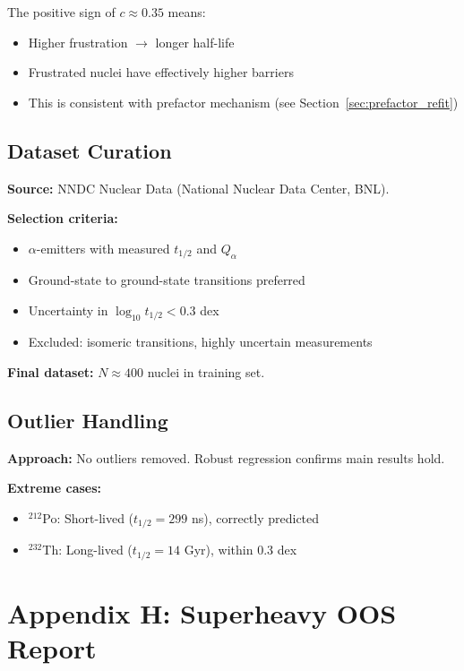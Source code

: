 \documentclass[11pt,a4paper]{article}
\begin{document}
The positive sign of $c \approx 0.35$ means:
\begin{itemize}[nosep]
    \item Higher frustration $\to$ longer half-life
    \item Frustrated nuclei have effectively higher barriers
    \item This is consistent with prefactor mechanism (see Section~\ref{sec:prefactor_refit})
\end{itemize}

\subsection{Dataset Curation}

\textbf{Source:} NNDC Nuclear Data (National Nuclear Data Center, BNL).

\textbf{Selection criteria:}
\begin{itemize}[nosep]
    \item $\alpha$-emitters with measured $t_{1/2}$ and $Q_\alpha$
    \item Ground-state to ground-state transitions preferred
    \item Uncertainty in $\log_{10} t_{1/2} < 0.3$ dex
    \item Excluded: isomeric transitions, highly uncertain measurements
\end{itemize}

\textbf{Final dataset:} $N \approx 400$ nuclei in training set.

\subsection{Outlier Handling}

\textbf{Approach:} No outliers removed. Robust regression confirms main results hold.

\textbf{Extreme cases:}
\begin{itemize}[nosep]
    \item $^{212}$Po: Short-lived ($t_{1/2} = 299$ ns), correctly predicted
    \item $^{232}$Th: Long-lived ($t_{1/2} = 14$ Gyr), within 0.3 dex
\end{itemize}

\section{Appendix H: Superheavy OOS Report}
\label{app:superheavy}
\end{document}
